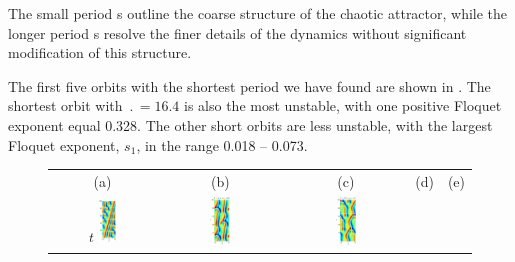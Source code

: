 The small period \rpo s outline the
coarse structure of the chaotic attractor, while the longer period
\rpo s resolve the finer details of the dynamics
without significant modification of this structure.

The first five orbits with the shortest period we have found are
shown in .  The shortest orbit with
$\period{} = 16.4$ is also the most unstable, with one positive
Floquet exponent equal 0.328.  The other short orbits are less
unstable, with the largest Floquet exponent, $s_1$, in the range
0.018 -- 0.073.


\begin{figure}[t]
\begin{center}
\begin{tabular}{ccccc} (a) & (b) & (c) & (d) & (e)\\
$t$
\includegraphics[width=0.18\textwidth]{figs/ks22rpo016.3-02.86.eps}\hspace{-3ex} &
\includegraphics[width=0.18\textwidth]{figs/ks22rpo032.8-10.96.eps}\hspace{-3ex} &
\includegraphics[width=0.18\textwidth]{figs/ks22rpo033.5-04.04.eps}\hspace{-3ex} &

\end{tabular}
\end{center}
\end{figure}

